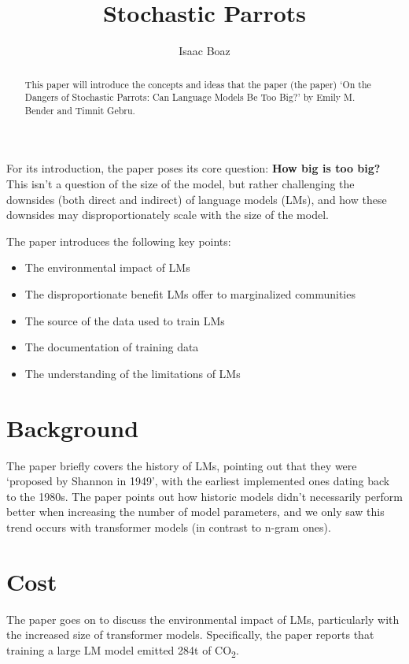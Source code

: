 \documentclass[12pt]{article}
\begin{document}
\title{Stochastic Parrots}
\author{Isaac Boaz}
\maketitle

\begin{abstract}
    This paper will introduce the concepts and ideas that the paper (the paper)
    `On the Dangers of Stochastic Parrots: Can Language Models Be Too Big?' by
    Emily M. Bender and Timnit Gebru.
\end{abstract}

For its introduction, the paper poses its core question: \textbf{How big is too
    big?} This isn't a question of the size of the model, but rather
challenging the downsides (both direct and indirect) of language models
(LMs), and how these downsides may disproportionately scale with the size of
the model.

\begin{singlespace}
    The paper introduces the following key points:
    \begin{itemize}
        \item The environmental impact of LMs
        \item The disproportionate benefit LMs offer to marginalized communities
        \item The source of the data used to train LMs
        \item The documentation of training data
        \item The understanding of the limitations of LMs
    \end{itemize}
\end{singlespace}

\section*{Background}
The paper briefly covers the history of LMs, pointing out that they were
`proposed by Shannon in 1949', with the earliest implemented ones dating back to
the 1980s. The paper points out how historic models didn't necessarily perform
better when increasing the number of model parameters, and we only saw this
trend occurs with transformer models (in contrast to n-gram ones).

\section*{Cost}
The paper goes on to discuss the environmental impact of LMs, particularly with
the increased size of transformer models. Specifically, the paper reports that
training a large LM model emitted 284t of CO\textsubscript{2}.
\end{document}
